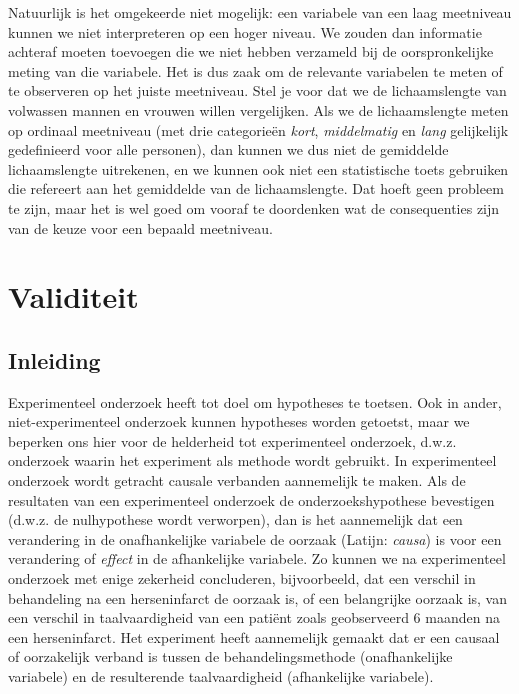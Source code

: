 \documentclass[
]{book}
\begin{document}
Natuurlijk is het omgekeerde niet mogelijk: een variabele van een laag
meetniveau kunnen we niet interpreteren op een hoger niveau. We zouden
dan informatie achteraf moeten toevoegen die we niet hebben verzameld
bij de oorspronkelijke meting van die variabele. Het is dus zaak om de
relevante variabelen te meten of te observeren op het juiste meetniveau.
Stel je
voor dat we de lichaamslengte van volwassen mannen en vrouwen willen
vergelijken. Als we de lichaamslengte meten op ordinaal meetniveau (met
drie categorieën \emph{kort}, \emph{middelmatig} en \emph{lang} gelijkelijk
gedefinieerd voor alle personen), dan kunnen we dus niet de gemiddelde
lichaamslengte uitrekenen, en we kunnen ook niet een statistische toets
gebruiken die refereert aan het gemiddelde van de lichaamslengte. Dat
hoeft geen probleem te zijn, maar het is wel goed om vooraf te
doordenken wat de consequenties zijn van de keuze voor een bepaald
meetniveau.

\chapter{Validiteit}\label{ch-validiteit}

\section{Inleiding}\label{inleiding-2}

Experimenteel onderzoek heeft tot doel om hypotheses te toetsen. Ook in
ander, niet-experimenteel onderzoek kunnen hypotheses worden getoetst,
maar we beperken ons hier voor de helderheid tot experimenteel
onderzoek, d.w.z. onderzoek waarin het experiment als methode wordt
gebruikt. In experimenteel onderzoek wordt getracht causale verbanden
aannemelijk te maken. Als de resultaten van een experimenteel onderzoek
de onderzoekshypothese bevestigen (d.w.z. de nulhypothese wordt
verworpen), dan is het aannemelijk dat een verandering in de
onafhankelijke variabele de oorzaak (Latijn: \emph{causa}) is voor een
verandering of \emph{effect} in de afhankelijke variabele. Zo kunnen we na
experimenteel onderzoek met enige zekerheid concluderen, bijvoorbeeld,
dat een verschil in behandeling na een herseninfarct de oorzaak is, of
een belangrijke oorzaak is, van een verschil in taalvaardigheid van een
patiënt zoals geobserveerd 6 maanden na een herseninfarct. Het
experiment heeft aannemelijk gemaakt dat er een causaal of oorzakelijk
verband is tussen de behandelingsmethode (onafhankelijke variabele) en
de resulterende taalvaardigheid (afhankelijke variabele).
\end{document}

